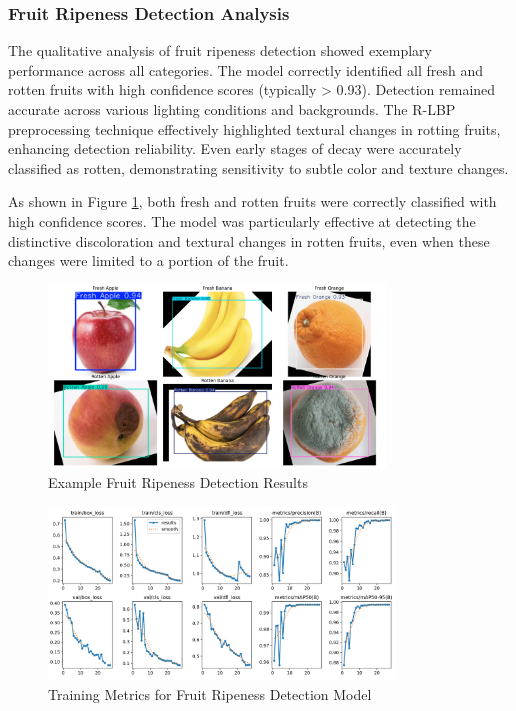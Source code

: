 \begin{multicols}{2}
\subsubsection{Fruit Ripeness Detection Analysis}

The qualitative analysis of fruit ripeness detection showed exemplary performance across all categories. The model correctly identified all fresh and rotten fruits with high confidence scores (typically > 0.93). Detection remained accurate across various lighting conditions and backgrounds. The R-LBP preprocessing technique effectively highlighted textural changes in rotting fruits, enhancing detection reliability. Even early stages of decay were accurately classified as rotten, demonstrating sensitivity to subtle color and texture changes.

As shown in Figure \ref{fig:fruit_examples}, both fresh and rotten fruits were correctly classified with high confidence scores. The model was particularly effective at detecting the distinctive discoloration and textural changes in rotten fruits, even when these changes were limited to a portion of the fruit.
\end{multicols}

\begin{figure}[ht]
\centering
\includegraphics[width=0.8\textwidth]{datas/agriculture/Figure_1.png}
\caption{Example Fruit Ripeness Detection Results}
\label{fig:fruit_examples}
\end{figure}


\begin{figure}[ht]
\centering
\includegraphics[width=0.82\textwidth]{datas/agriculture/results.png}
\caption{Training Metrics for Fruit Ripeness Detection Model}
\label{fig:fruit_training}
\end{figure}

